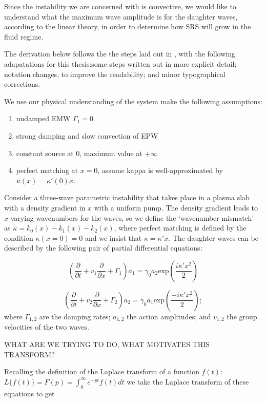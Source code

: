Since the instability we are concerned with is convective, we would like to understand what the maximum wave amplitude is for the daughter waves, according to the linear theory, in order to determine how SRS will grow in the fluid regime.

The derivation below follows the the steps laid out in \citet{Nishikawa1976}, with the following adapatations for this thesis:some steps written out in more explicit detail; notation changes, to improve the readability; and minor typographical corrections. 

We use our physical understanding of the system make the following assumptions:
\begin{enumerate}
	\item undamped EMW $\Gamma_1 = 0$
	\item strong damping and slow convection of EPW
	\item constant source at 0, maximum value at $+\infty$
	\item perfect matching at $x=0$, assume kappa is well-approximated by 
	$\kappa(x) = \kappa'(0)x$.
\end{enumerate}

Consider a three-wave parametric instability that takes place in a plasma slab with a density gradient in $x$ with a uniform pump. The density gradient leads to $x$-varying wavenumbers for the waves, so we define the `wavenumber mismatch' as $\kappa = k_0(x) - k_1(x) - k_2(x)$, where perfect matching is defined by the condition $\kappa(x=0) = 0$ and we insist that $\kappa = \kappa' x$. The daughter waves can be described by the following pair of partial differential equations:

\begin{equation}
 \left(\frac{\partial}{\partial t} + v_1\frac{\partial}{\partial x} + \Gamma_1 \right)a_1 = \gamma_0a_2\text{exp}\left(\frac{i\kappa'x^2}{2}\right)
\end{equation}

\begin{equation}
 \left(\frac{\partial}{\partial t} + v_2\frac{\partial}{\partial x} + \Gamma_2 \right)a_2 = \gamma_0a_1\text{exp}\left(\frac{-i\kappa'x^2}{2}\right);
\end{equation} 
where $\Gamma_{1,2}$ are the damping rates; $a_{1,2}$ the action amplitudes; and $v_{1,2}$ the group velocities of the two waves. 

WHAT ARE WE TRYING TO DO, WHAT MOTIVATES THIS TRANSFORM?

Recalling the definition of the Laplace transform of a function $f(t)$: $L\{f(t)\}= F(p) = \int_0^\infty e^{-pt} f(t) dt$ we take the Laplace transform of these equations to get






